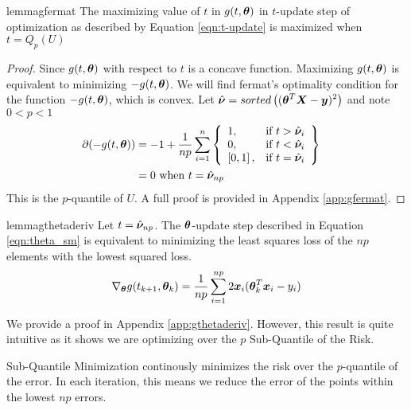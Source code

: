 \documentclass{article} %
\begin{document}
	\begin{restatable}{lemma}{gfermat}
		\label{lem:gfermat}
		The maximizing value of $t$ in $g(t,{\bm{\theta}})$ in $t$-update step of optimization as described by Equation \ref{eqn:t-update} is maximized when $t = Q_p(U)$
	\end{restatable}
		\begin{proof}
		Since $\displaystyle g(t,{\bm{\theta}})$ with respect to $t$ is a concave function. Maximizing $g(t,{\bm{\theta}})$ is equivalent to minimizing $-g(t,{\bm{\theta}})$. We will find fermat's optimality condition for the function $\displaystyle -g(t,{\bm{\theta}})$, which is convex. 
		Let $\displaystyle \hat{{\bm{\nu}}} = sorted\left(({\bm{\theta}}^T{\bm{X}} - {\bm{y}})^2\right)$ and note $\displaystyle 0 < p < 1$
		\begin{align}
			\partial{\displaystyle (-g(t,\boldsymbol{\theta}})) 
			&= -1 + \frac{1}{np}\sum_{i=1}^{n}
			\left\{
			\begin{array}{lr}
				1, & \text{if } t > \hat{{\bm{\nu}}}_i\\
				0, & \text{if } t < \hat{{\bm{\nu}}}_i \\
				\left[0,1\right], & \text{if } t = \hat{{\bm{\nu}}}_i \\
			\end{array}
			\right\}&&\\
			&= 0 \text{ when }\displaystyle t = \hat{{\bm{\nu}}}_{np}&&
		\end{align}
		This is the $p$-quantile of $U$. A full proof is provided in Appendix \ref{app:gfermat}.
	\end{proof}
	
	\begin{restatable}{lemma}{gthetaderiv}\label{lem:gthetaderiv}
		Let $t = \hat{{\bm{\nu}}}_{np}$. The ${\bm{\theta}}$-update step described in Equation \ref{eqn:theta_sm} is equivalent to minimizing the least squares loss of the $np$ elements with the lowest squared loss.
	   \begin{equation}
			\nabla_{{\bm{\theta}}}g(t_{k+1},{\bm{\theta}}_k) = \frac{1}{np}\sum_{i=1}^{np}2{\bm{x}}_i({\bm{\theta}}_k^T{\bm{x}}_i - y_i)
		\end{equation}
	\end{restatable}
	We provide a proof in Appendix \ref{app:gthetaderiv}. However, this result is quite intuitive as it shows we are optimizing over the $p$ Sub-Quantile of the Risk.
	\begin{interpretation}
		Sub-Quantile Minimization continously minimizes the risk over the $p$-quantile of the error. In each iteration, this means we reduce the error of the points within the lowest $np$ errors.
	\end{interpretation}
\end{document}
